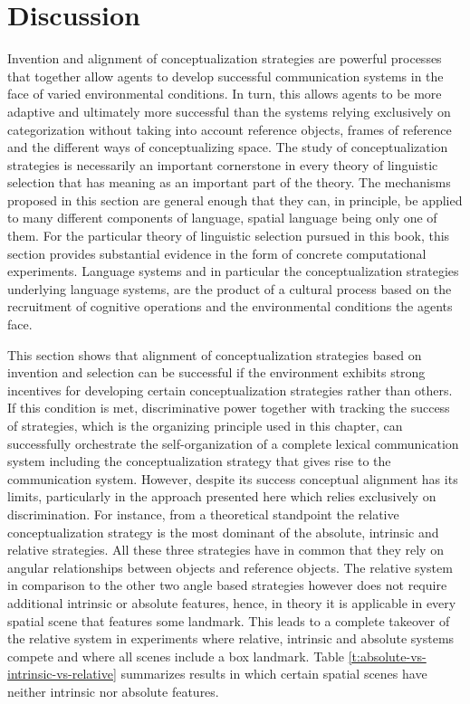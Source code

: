 \section{Discussion}
Invention and alignment of conceptualization strategies are powerful processes that 
together allow agents to develop successful communication systems in the face of
varied environmental conditions. In turn, this allows agents to be more adaptive 
and ultimately more successful than the systems relying exclusively on categorization without 
taking into account reference objects, frames of reference and the different ways
of conceptualizing space. The study of conceptualization strategies is necessarily 
an important cornerstone in every theory of linguistic selection that has meaning as an important
part of the theory. The mechanisms proposed in this section are general enough that they
can, in principle, be applied to many different components of language, spatial language being only 
one of them. For the particular theory of linguistic selection pursued in this book, this 
section provides substantial evidence in the form of concrete computational experiments.
Language systems and in particular the conceptualization strategies underlying language systems, 
are the product of a cultural process based on the recruitment of cognitive operations 
and the environmental conditions the agents face.

This section shows that alignment of conceptualization strategies based on invention and selection
can be successful if the environment exhibits strong incentives for developing certain 
conceptualization strategies rather than others.
If this condition is met, discriminative power together with tracking the success of strategies,
which is the organizing principle used in this chapter,
can successfully orchestrate the self-organization of a complete lexical communication system
including the conceptualization strategy that gives rise to the communication system.
However, despite its success conceptual alignment has its limits, particularly in 
the approach presented here which relies exclusively on discrimination.
For instance, from a theoretical standpoint the relative conceptualization strategy
is the most dominant of the absolute, intrinsic and relative strategies. All these three strategies
have in common that they rely on angular relationships between objects and reference objects. 
The relative system in comparison to the other two angle based strategies however does not require additional 
intrinsic or absolute features, hence, in theory it is applicable in every 
spatial scene that features some landmark. This leads to a complete takeover of the 
relative system in experiments where relative, intrinsic and absolute systems compete
and where all scenes include a box landmark.
Table \ref{t:absolute-vs-intrinsic-vs-relative} summarizes
results in which certain spatial scenes have neither intrinsic nor absolute features.

